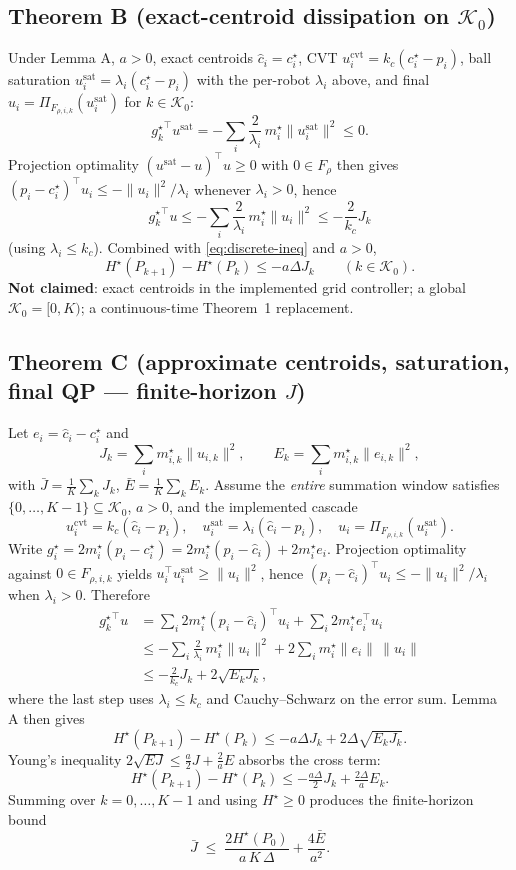 \subsection{Theorem B (exact-centroid dissipation on $\mathcal{K}_0$)}
Under Lemma A, $a>0$, exact centroids $\hat c_i=c_i^\star$, CVT
$u_i^{\mathrm{cvt}}=k_c(c_i^\star-p_i)$, ball saturation
$u_i^{\mathrm{sat}}=\lambda_i(c_i^\star-p_i)$ with the per-robot $\lambda_i$ above,
and final $u_i=\Pi_{F_{\rho,i,k}}(u_i^{\mathrm{sat}})$ for $k\in\mathcal{K}_0$:
\[
{g_k^\star}^\top u^{\mathrm{sat}}
=-\sum_i\frac{2}{\lambda_i}\,m_i^\star\|u_i^{\mathrm{sat}}\|^2\le0.
\]
Projection optimality $(u^{\mathrm{sat}}-u)^\top u\ge0$ with $0\in F_\rho$ then gives
$(p_i-c_i^\star)^\top u_i\le-\|u_i\|^2/\lambda_i$ whenever $\lambda_i>0$, hence
\[
{g_k^\star}^\top u
\le-\sum_i\frac{2}{\lambda_i}\,m_i^\star\|u_i\|^2
\le-\frac{2}{k_c}J_k
\]
(using $\lambda_i\le k_c$). Combined with \eqref{eq:discrete-ineq} and $a>0$,
\[
H^\star(P_{k+1})-H^\star(P_k)\le -a\Delta J_k
\qquad(k\in\mathcal{K}_0).
\]
\textbf{Not claimed}: exact centroids in the implemented grid controller; a
global $\mathcal{K}_0=[0,K)$; a continuous-time Theorem~1 replacement.

\subsection{Theorem C (approximate centroids, saturation, final QP --- finite-horizon $J$)}
Let $e_i=\hat c_i-c_i^\star$ and
\[
J_k=\sum_i m_{i,k}^\star\|u_{i,k}\|^2,\qquad
E_k=\sum_i m_{i,k}^\star\|e_{i,k}\|^2,
\]
with $\bar J=\tfrac1K\sum_k J_k$, $\bar E=\tfrac1K\sum_k E_k$.
Assume the \emph{entire} summation window satisfies $\{0,\dots,K-1\}\subseteq\mathcal{K}_0$,
$a>0$, and the implemented cascade
\[
u_i^{\mathrm{cvt}}=k_c(\hat c_i-p_i),\quad
u_i^{\mathrm{sat}}=\lambda_i(\hat c_i-p_i),\quad
u_i=\Pi_{F_{\rho,i,k}}(u_i^{\mathrm{sat}}).
\]
Write $g_i^\star=2m_i^\star(p_i-c_i^\star)=2m_i^\star(p_i-\hat c_i)+2m_i^\star e_i$.
Projection optimality against $0\in F_{\rho,i,k}$ yields
$u_i^\top u_i^{\mathrm{sat}}\ge\|u_i\|^2$, hence
$(p_i-\hat c_i)^\top u_i\le-\|u_i\|^2/\lambda_i$ when $\lambda_i>0$. Therefore
\begin{align*}
{g_k^\star}^\top u
&=\sum_i 2m_i^\star(p_i-\hat c_i)^\top u_i
+\sum_i 2m_i^\star e_i^\top u_i \\
&\le -\sum_i\frac{2}{\lambda_i}\,m_i^\star\|u_i\|^2
+2\sum_i m_i^\star\|e_i\|\,\|u_i\| \\
&\le -\frac{2}{k_c}J_k+2\sqrt{E_k J_k},
\end{align*}
where the last step uses $\lambda_i\le k_c$ and Cauchy--Schwarz on the error sum.
Lemma A then gives
\[
H^\star(P_{k+1})-H^\star(P_k)
\le -a\Delta J_k+2\Delta\sqrt{E_k J_k}.
\]
Young's inequality $2\sqrt{EJ}\le\tfrac a2 J+\tfrac2a E$ absorbs the cross term:
\[
H^\star(P_{k+1})-H^\star(P_k)
\le -\tfrac{a\Delta}{2}J_k+\tfrac{2\Delta}{a}E_k.
\]
Summing over $k=0,\dots,K-1$ and using $H^\star\ge0$ produces the finite-horizon bound
\begin{equation}
\bar J\;\le\;\frac{2H^\star(P_0)}{a\,K\,\Delta}+\frac{4\bar E}{a^2}.
\tag{$\star$}\label{eq:starbound}
\end{equation}

